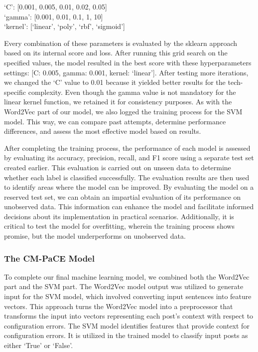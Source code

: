 \documentclass[english,bachelor]{swsLeipzig}
\begin{document}
\begin{adjustwidth}{1cm}{0cm}
  `C': [0.001, 0.005, 0.01, 0.02, 0.05]\\
`gamma': [0.001, 0.01, 0.1, 1, 10]\\
`kernel': [`linear', `poly', `rbf', `sigmoid']\\
\end{adjustwidth}

Every combination of these parameters is evaluated by the sklearn approach based on its internal score and loss. After 
running this grid search on the specified values, the model resulted in the best score with these hyperparameters settings: [C: 0.005, gamma: 0.001, kernel: `linear']. After testing more iterations, we changed the `C' value to 0.01 because it yielded better results for the tech-specific complexity. Even though the gamma value is not mandatory for the linear kernel function, we retained it for consistency purposes. As with the Word2Vec part of our model, we also logged the training process for the SVM model. This way, we can compare past attempts, determine performance differences, and assess the most effective model based on results.

After completing the training process, the performance of each model is assessed by evaluating its accuracy, 
precision, recall, and F1 score using a separate test set created earlier. This evaluation is carried out on unseen data to determine whether each label is classified successfully. The evaluation results are then used to identify areas where the model can be improved. By evaluating the model on a reserved test set, we can obtain an impartial evaluation of its performance on unobserved data. This information can enhance the model and facilitate informed decisions about its implementation in practical scenarios. Additionally, it is critical to test the model for overfitting, wherein the training process shows promise, but the model underperforms on unobserved data.

\subsubsection{The CM-PaCE Model}
To complete our final machine learning model, we combined both the Word2Vec part and the SVM part. The Word2Vec model 
output was utilized to generate input for the SVM model, which involved converting input sentences into feature vectors. This approach turns the Word2Vec model into a preprocessor that transforms the input into vectors representing each post's context with respect to configuration errors. The SVM model identifies features that provide context for configuration errors. It is utilized in the trained model to classify input posts as either `True' or `False'.
\end{document}
